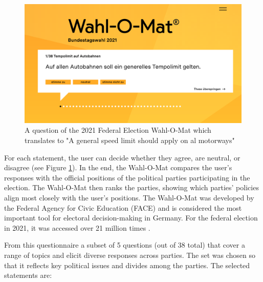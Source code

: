 \begin{figure}
    \centering
    \includegraphics[width=0.9\linewidth]{imgs/Wahl-O-Mat-Tempo.png}
    \caption{A question of the 2021 Federal Election Wahl-O-Mat which translates to "A general speed limit should apply on al motorways"}
    \label{fig:Wahl-O-Mat}
\end{figure}



For each statement, the user can decide whether they agree, are neutral, or disagree (see Figure \ref{fig:Wahl-O-Mat}). In the end, the Wahl-O-Mat compares the user’s responses with the official positions of the political parties participating in the election. The Wahl-O-Mat then ranks the parties, showing which parties’ policies align most closely with the user’s positions. The Wahl-O-Mat was developed by the Federal Agency for Civic Education (FACE) and is considered the most important tool for electoral decision-making in Germany. For the federal election in 2021, it was accessed over 21 million times \citep{bpb2021geschichte}. 


From this questionnaire a subset of 5 questions (out of 38 total) that cover a range of topics and elicit diverse responses across parties. The set was chosen so that it reflects key political issues and divides among the parties. The selected statements are:




